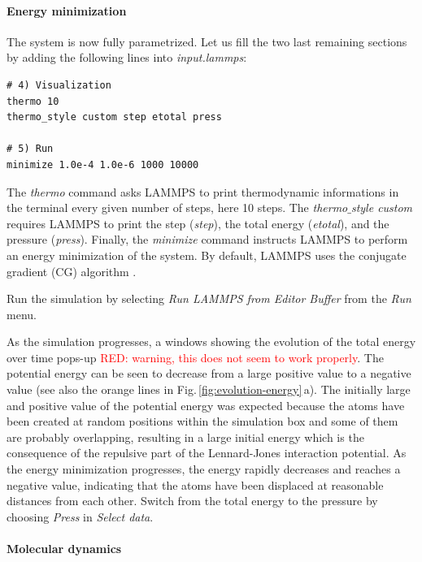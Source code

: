 \documentclass[9pt,tutorial]{livecoms}
\begin{document}
\paragraph{Energy minimization}
The system is now fully parametrized. Let us fill the two last remaining sections by adding the following lines into \textit{input.lammps}:
{\normalsize \begin{verbatim}
# 4) Visualization
thermo 10
thermo_style custom step etotal press

# 5) Run
minimize 1.0e-4 1.0e-6 1000 10000
\end{verbatim}}
The \textit{thermo} command asks LAMMPS to print thermodynamic informations in the terminal every given number of steps, here 10 steps. The \textit{thermo$\_$style custom} requires LAMMPS to print the step (\textit{step}), the total energy (\textit{etotal}), and the pressure (\textit{press}). Finally, the \textit{minimize} command instructs LAMMPS to perform an energy minimization of the system. By default, LAMMPS uses the conjugate gradient (CG) algorithm \cite{hestenes1952methods}.

Run the simulation by selecting \textit{Run LAMMPS from Editor Buffer} from the \textit{Run} menu.

As the simulation progresses, a windows showing the evolution of the total energy over time pops-up \textcolor{red}{RED: warning, this does not seem to work properly}. The potential energy can be seen to decrease from a large positive value to a negative value (see also the orange lines in Fig.\,\ref{fig:evolution-energy}\,a). The initially large and positive value of the potential energy was expected because the atoms have been created at random positions within the simulation box and some of them are probably overlapping, resulting in a large initial energy which is the consequence of the repulsive part of the Lennard-Jones interaction potential. As the energy minimization progresses, the energy rapidly decreases and reaches a negative value, indicating that the atoms have been displaced at reasonable distances from each other. Switch from the total energy to the pressure by choosing \textit{Press} in \textit{Select data}.

\paragraph{Molecular dynamics}
\end{document}
